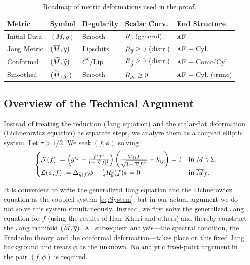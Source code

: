 \begin{table}[ht]
\centering
\renewcommand{\arraystretch}{1.2}
\small
\begin{tabular}{|l|l|l|l|l|}
\hline
\textbf{Metric} & \textbf{Symbol} & \textbf{Regularity} & \textbf{Scalar Curv.} & \textbf{End Structure} \\ \hline
Initial Data & $(M,g)$ & Smooth & $R_g$ (general) & AF \\ \hline
Jang Metric & $(\overline{M}, \overline{g})$ & Lipschitz & $R_{\overline{g}} \ge 0$ (distr.) & AF + Cyl. \\ \hline
Conformal & $(\widetilde{M}, \widetilde{g})$ & $C^0$/Lip & $R_{\widetilde{g}} \ge 0$ (distr.) & AF + Conic/Cyl. \\ \hline
Smoothed & $(\widetilde{M}, g_{\epsilon})$ & Smooth & $R_{g_{\epsilon}} \ge 0$ & AF + Cyl. (trunc) \\ \hline
\end{tabular}
\caption{Roadmap of metric deformations used in the proof.}
\label{tab:MetricRoadmap_Legacy}
\end{table}

\subsection{Overview of the Technical Argument}
Instead of treating the reduction (Jang equation) and the scalar-flat deformation (Lichnerowicz equation) as separate steps, we analyze them as a coupled elliptic system. Let $\tau > 1/2$. We seek $(f, \phi)$ solving
\begin{equation}\label{eq:System}
    \begin{cases}
        \mathcal{J}(f) := \left( g^{ij} - \frac{f^i f^j}{1+|\nabla f|^2} \right) \left( \frac{\nabla_{ij}f}{\sqrt{1+|\nabla f|^2}} - k_{ij} \right) = 0 & \text{in } M \setminus \Sigma, \\
        \mathcal{L}(\phi, f) := \Delta_{\overline{g}(f)} \phi - \frac{1}{8} R_{\overline{g}}(f) \phi = 0 & \text{in } \overline{M}_f.
    \end{cases}
\end{equation}

\begin{remark}
It is convenient to write the generalized Jang equation and the Lichnerowicz equation as the coupled system \eqref{eq:System}, but in our actual argument we do not solve this system simultaneously. Instead, we first solve the generalized Jang equation for $f$ (using the results of Han--Khuri and others) and thereby construct the Jang manifold $(\overline{M},\overline{g})$. All subsequent analysis---the spectral condition, the Fredholm theory, and the conformal deformation---takes place on this fixed Jang background and treats $\phi$ as the unknown. No analytic fixed-point argument in the pair $(f,\phi)$ is required.
\end{remark}

